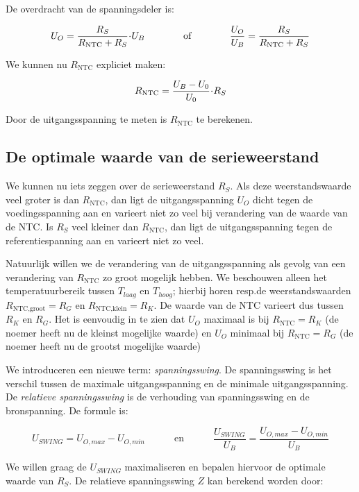 \documentclass[12pt,a4paper,final,twoside,fleqn]{article}
\newcommand{\rntc}{R_\text{NTC}}
\let\oldcdot\cdot
\renewcommand{\cdot}{\kern-.10em\oldcdot\kern-.10em}
\begin{document}
De overdracht van de spanningsdeler is:

\begin{equation}
U_O = \dfrac{R_S}{\rntc + R_S}\cdot U_B \qquad\qquad\text{of}\qquad\qquad \dfrac{U_O}{U_B}=\dfrac{R_S}{\rntc + R_S}
\end{equation}

We kunnen nu $\rntc$ expliciet maken:

\begin{equation}
\rntc = \dfrac{U_B-U_0}{U_0}\cdot R_S
\end{equation}

Door de uitgangsspanning te meten is $\rntc$ te berekenen.

\subsection{De optimale waarde van de serieweerstand}
We kunnen nu iets zeggen over de serieweerstand $R_S$. Als deze weerstandswaarde
veel groter is dan $\rntc$, dan ligt de uitgangsspanning $U_O$ dicht tegen de
voedingsspanning aan en varieert niet zo veel bij verandering van de waarde van
de NTC. Is $R_S$ veel kleiner dan $\rntc$, dan ligt de uitgangsspanning tegen
de referentiespanning aan en varieert niet zo veel.

Natuurlijk willen we de verandering van de uitgangsspanning als gevolg van een
verandering van $\rntc$ zo groot mogelijk hebben. We beschouwen alleen het
temperatuurbereik tussen $T_{laag}$ en $T_{hoog}$; hierbij horen resp.\@ de
weerstandswaarden $R_\text{NTC,groot} = R_G$ en $R_\text{NTC,klein} = R_K$.
De waarde van de NTC varieert dus tussen $R_K$ en $R_G$. Het is eenvoudig in
te zien dat $U_O$ maximaal is bij $\rntc = R_K$ (de noemer heeft nu de kleinst
mogelijke waarde) en $U_O$ minimaal bij $\rntc = R_G$ (de noemer heeft nu de
grootst mogelijke waarde)

We introduceren een nieuwe term: \textsl{spanningsswing}. De spanningsswing is
het verschil tussen de maximale uitgangsspanning en de minimale uitgangsspanning.
De \textsl{relatieve spanningsswing} is de verhouding van spanningsswing en de
bronspanning. De formule is:

\begin{equation}
U_{SWING} = U_{O,max} - U_{O,min}\quad\qquad\text{en}\quad\qquad\dfrac{U_{SWING}}{U_B}=\dfrac{U_{O,max} - U_{O,min}}{U_B}
\end{equation}

We willen graag de $U_{SWING}$ maximaliseren en bepalen hiervoor de optimale waarde van $R_S$. De relatieve spanningsswing $Z$ kan berekend worden door:
\end{document}
